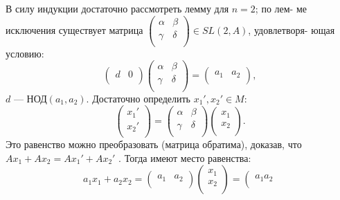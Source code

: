 \documentclass{mai_book}
\begin{document}
\begin{myproof}
В силу индукции достаточно рассмотреть лемму для $n=2$; по лем- \linebreak ме исключения существует матрица ${\left( \begin{array}{ccc}
\alpha & \beta \\
\gamma & \delta \\
\end{array} \right)} \in SL(2,A)$, удовлетворя- \linebreak ющая условию:  
$${\left( \begin{array}{ccc}
d & 0 \\
\end{array} \right)}{\left( \begin{array}{ccc}
\alpha & \beta \\
\gamma & \delta \\
\end{array} \right)}={\left( \begin{array}{ccc}
a_1 & a_2 \\
\end{array} \right)},$$
$d$ — НОД$(a_1, a_2)$. Достаточно определить $x_1', x_2' \in M$:
$${\left( \begin{array}{ccc}
x_1' \\
x_2' \\
\end{array} \right)}={\left( \begin{array}{ccc}
\alpha & \beta \\
\gamma & \delta \\
\end{array} \right)}{\left( \begin{array}{ccc}
x_1 \\
x_2 \\
\end{array} \right)}.$$
Это равенство можно преобразовать (матрица обратима), доказав, \linebreak что $Ax_1+ Ax_2= Ax_1' + Ax_2'$ . Тогда имеют место равенства:  
$$a_1x_1 + a_2x_2 = {\left( \begin{array}{ccc}
a_1 & a_2 \\
\end{array} \right)}{\left( \begin{array}{ccc}
x_1 \\
x_2 \\
\end{array} \right)} = {\left( \begin{array}{ccc}
a_1 a_2 \\

\end{array}}$$
\end{myproof}
\end{document}
